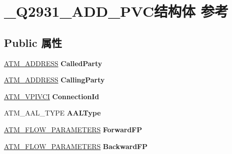 \hypertarget{struct___q2931___a_d_d___p_v_c}{}\section{\+\_\+\+Q2931\+\_\+\+A\+D\+D\+\_\+\+P\+V\+C结构体 参考}
\label{struct___q2931___a_d_d___p_v_c}
\subsection*{Public 属性}
\begin{DoxyCompactItemize}
\item 
\mbox{\label{struct___q2931___a_d_d___p_v_c_a5352b1f6a7429e7f14117ea2ecf0b2ad}} 
\hyperlink{struct_a_t_m___a_d_d_r_e_s_s}{A\+T\+M\+\_\+\+A\+D\+D\+R\+E\+SS} {\bfseries Called\+Party}
\item 
\mbox{\label{struct___q2931___a_d_d___p_v_c_ae877f72962cf9bb8be4514f9a7c5540e}} 
\hyperlink{struct_a_t_m___a_d_d_r_e_s_s}{A\+T\+M\+\_\+\+A\+D\+D\+R\+E\+SS} {\bfseries Calling\+Party}
\item 
\mbox{\label{struct___q2931___a_d_d___p_v_c_abe82ee2e1df8f0e4c546ace9730e114e}} 
\hyperlink{struct___a_t_m___v_p_i_v_c_i}{A\+T\+M\+\_\+\+V\+P\+I\+V\+CI} {\bfseries Connection\+Id}
\item 
\mbox{\label{struct___q2931___a_d_d___p_v_c_a88ad826740242003f212825e81acbb41}} 
A\+T\+M\+\_\+\+A\+A\+L\+\_\+\+T\+Y\+PE {\bfseries A\+A\+L\+Type}
\item 
\mbox{\label{struct___q2931___a_d_d___p_v_c_a30da723e456dc8c7f0ef7f8f1df24a87}} 
\hyperlink{struct___a_t_m___f_l_o_w___p_a_r_a_m_e_t_e_r_s}{A\+T\+M\+\_\+\+F\+L\+O\+W\+\_\+\+P\+A\+R\+A\+M\+E\+T\+E\+RS} {\bfseries Forward\+FP}
\item 
\mbox{\label{struct___q2931___a_d_d___p_v_c_a6825e06bff9a60b6b85d8d139a70d2ae}} 
\hyperlink{struct___a_t_m___f_l_o_w___p_a_r_a_m_e_t_e_r_s}{A\+T\+M\+\_\+\+F\+L\+O\+W\+\_\+\+P\+A\+R\+A\+M\+E\+T\+E\+RS} {\bfseries Backward\+FP}
\item 
\mbox{\label{struct___q2931___a_d_d___p_v_c_a6c1af2c58241d28d583d01f631a40ac4}} 

\end{DoxyCompactItemize}
